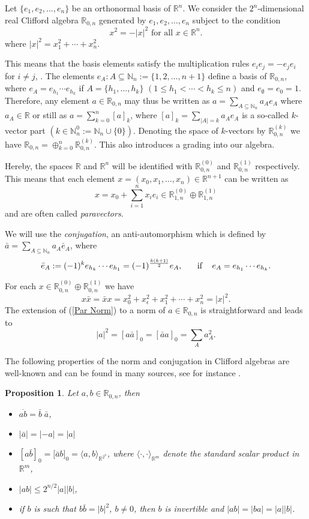 \documentclass[12pt]{amsart}
\newtheorem{proposition}[theorem]{Proposition}
\theoremstyle{definition}
\newcommand{\R}{\mathbb{R}}
\newcommand{\N}{\mathbb{N}}
\newcommand{\Cl}{\R_{0,n}}
\newcommand{\inci}{\subseteq}
\newcommand{\ba}{\overline}
\begin{document}
Let $\{e_1,e_2,\ldots,e_n\}$ be an orthonormal basis of $\R^n$. We consider the $2^n$-dimensional real Clifford algebra $\R_{0,n}$ generated by $e_1,e_2,\ldots,e_n$ subject to the condition 
$$
x^2=-|x|^2 \mbox{ for all } x\in\mathbb{R}^n.
$$
where $|x|^2=x_1^2+\cdots +x_n^2$. 

This means that the basis elements satisfy the multiplication rules $e_ie_j=-e_je_i$ for $i\neq j$, . The elements $e_A : A\subseteq \N_n:=\{1,2,\ldots, n+1\}$ define a basis of $\R_{0,n}$, where $e_A=e_{h_1}\cdots e_{h_k}$ if $A=\{h_1, \ldots,h_k\}$ $(1\leq h_1<\cdots<h_k\leq n)$ and $e_\emptyset=e_0=1$. Therefore, any element $a\in\R_{0,n}$ may thus be written as $a=\sum_{A\inci\N_n}a_Ae_A$ where $a_A\in\R$ or still as $a=\sum_{k=0}^n[a]_k$, where {$[a]_k=\sum_{|A|=k}a_A e_A$} is a so-called $k$-vector part $(k\in\N_n^0:=\N_n\cup\{0\})$. Denoting the space of $k$-vectors by $\R_{0,n}^{(k)}$ we have $\R_{0,n}=\oplus_{k=0}^n\R_{0,n}^{(k)}$. This also introduces a grading into our algebra.

Hereby, the spaces $\R$ and $\R^n$ will be identified with 
 $\R_{0,n}^{(0)}$ and $\R_{0,n}^{(1)}$ respectively. This means that each element $x=(x_0, x_1,\ldots, x_n)\in\R^{n+1}$ can be written as
	\[x=x_0+ \sum_{i=1}^nx_ie_i\in\R_{1,n}^{(0)}\oplus\R_{1,n}^{(1)}
\]
and are often called {\it paravectors}. 


We will use the {\it conjugation}, an anti-automorphism which is defined by $\bar{a}=\sum_{A\inci\N_n}a_A\bar{e}_A$, where 
	\[\bar{e}_A:=(-1)^ke_{h_k}\cdots e_{h_1}=(-1)^{\frac{k(k+1)}{2}}e_A, \hspace{.5cm}\mbox{ if  } \hspace{.3cm} e_A=e_{h_1}\cdots e_{h_k}.
\]

For each $x\in \R_{0,n}^{(0)}\oplus\R_{0,n}^{(1)}$ we have 
\begin{equation}\label{Par Norm}
x\bar{x}=\bar{x}x=x_0^2+x_\epsilon^2 + x_1^2+\cdots+x_n^2=|x|^2.
\end{equation}
The extension of (\ref{Par Norm}) to a norm of $a\in\R_{0,n}$ is straightforward and leads to 
	\[|a|^2=[a\bar{a}]_0=[\bar{a}a]_0=\sum_A a_A^2.
\]

The following properties of the norm and conjugation in Clifford algebras are well-known and can be found in many sources, see for instance \cite{DSS}. 
\begin{proposition}
Let $a,b\in\Cl$, then
\begin{itemize}
  \item[(i)] $\ba{ab}=\bar{b}\; \bar{a}$,
	\item[(ii)] $|\bar{a}|=|-a|=|a|$ 
	\item[(iii)] $\left[a\bar{b}\right]_0=\big[\bar{a}b\big]_0=\langle a, b\rangle_{\R^{2^n}}$, where $\langle \cdot, \cdot\rangle_{\R^m}$ denote the standard scalar product in $\R^{m}$,
	\item[(iv)] $|ab|\leq 2^{n/2}|a||b|$,
	\item[(v)] if $b$ is such that $b\bar{b}=|b|^2$, $b\neq 0$, then $b$ is invertible and $|ab|=|ba|=|a||b|$.
\end{itemize}
\end{proposition}
\end{document}
